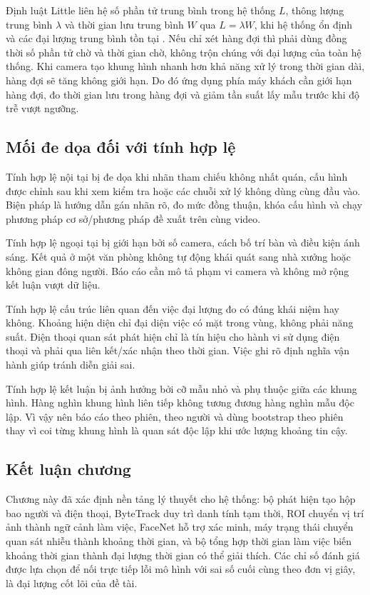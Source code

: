 Định luật Little liên hệ số phần tử trung bình trong hệ thống $L$, thông lượng trung bình $\lambda$ và thời gian lưu trung bình $W$ qua $L=\lambda W$, khi hệ thống ổn định và các đại lượng trung bình tồn tại \cite{little}. Nếu chỉ xét hàng đợi thì phải dùng đồng thời số phần tử chờ và thời gian chờ, không trộn chúng với đại lượng của toàn hệ thống. Khi camera tạo khung hình nhanh hơn khả năng xử lý trong thời gian dài, hàng đợi sẽ tăng không giới hạn. Do đó ứng dụng phía máy khách cần giới hạn hàng đợi, đo thời gian lưu trong hàng đợi và giảm tần suất lấy mẫu trước khi độ trễ vượt ngưỡng.

\subsection{Mối đe dọa đối với tính hợp lệ}
Tính hợp lệ nội tại bị đe dọa khi nhãn tham chiếu không nhất quán, cấu hình được chỉnh sau khi xem kiểm tra hoặc các chuỗi xử lý không dùng cùng đầu vào. Biện pháp là hướng dẫn gán nhãn rõ, đo mức đồng thuận, khóa cấu hình và chạy phương pháp cơ sở/phương pháp đề xuất trên cùng video.

Tính hợp lệ ngoại tại bị giới hạn bởi số camera, cách bố trí bàn và điều kiện ánh sáng. Kết quả ở một văn phòng không tự động khái quát sang nhà xưởng hoặc không gian đông người. Báo cáo cần mô tả phạm vi camera và không mở rộng kết luận vượt dữ liệu.

Tính hợp lệ cấu trúc liên quan đến việc đại lượng đo có đúng khái niệm hay không. Khoảng hiện diện chỉ đại diện việc có mặt trong vùng, không phải năng suất. Điện thoại quan sát phát hiện chỉ là tín hiệu cho hành vi sử dụng điện thoại và phải qua liên kết/xác nhận theo thời gian. Việc ghi rõ định nghĩa vận hành giúp tránh diễn giải sai.

Tính hợp lệ kết luận bị ảnh hưởng bởi cỡ mẫu nhỏ và phụ thuộc giữa các khung hình. Hàng nghìn khung hình liên tiếp không tương đương hàng nghìn mẫu độc lập. Vì vậy nên báo cáo theo phiên, theo người và dùng bootstrap theo phiên thay vì coi từng khung hình là quan sát độc lập khi ước lượng khoảng tin cậy.

\subsection{Kết luận chương}
Chương này đã xác định nền tảng lý thuyết cho hệ thống: bộ phát hiện tạo hộp bao người và điện thoại, ByteTrack duy trì danh tính tạm thời, ROI chuyển vị trí ảnh thành ngữ cảnh làm việc, FaceNet hỗ trợ xác minh, máy trạng thái chuyển quan sát nhiễu thành khoảng thời gian, và bộ tổng hợp thời gian làm việc biến khoảng thời gian thành đại lượng thời gian có thể giải thích. Các chỉ số đánh giá được lựa chọn để nối trực tiếp lỗi mô hình với sai số cuối cùng theo đơn vị giây, là đại lượng cốt lõi của đề tài.
